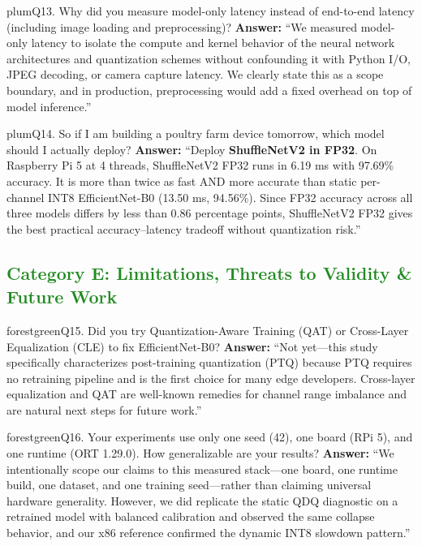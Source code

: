 \documentclass[10pt,a4paper]{article}
\begin{document}
\begin{qabox}{plum}{Q13. Why did you measure model-only latency instead of end-to-end latency (including image loading and preprocessing)?}
\textbf{Answer:}
``We measured model-only latency to isolate the compute and kernel behavior of the neural network architectures and quantization schemes without confounding it with Python I/O, JPEG decoding, or camera capture latency. We clearly state this as a scope boundary, and in production, preprocessing would add a fixed overhead on top of model inference.''
\end{qabox}

\begin{qabox}{plum}{Q14. So if I am building a poultry farm device tomorrow, which model should I actually deploy?}
\textbf{Answer:}
``Deploy \textbf{ShuffleNetV2 in FP32}. On Raspberry Pi 5 at 4 threads, ShuffleNetV2 FP32 runs in 6.19 ms with 97.69\% accuracy. It is more than twice as fast AND more accurate than static per-channel INT8 EfficientNet-B0 (13.50 ms, 94.56\%). Since FP32 accuracy across all three models differs by less than 0.86 percentage points, ShuffleNetV2 FP32 gives the best practical accuracy--latency tradeoff without quantization risk.''
\end{qabox}

\subsection*{\textcolor{forestgreen}{Category E: Limitations, Threats to Validity \& Future Work}}

\begin{qabox}{forestgreen}{Q15. Did you try Quantization-Aware Training (QAT) or Cross-Layer Equalization (CLE) to fix EfficientNet-B0?}
\textbf{Answer:}
``Not yet---this study specifically characterizes post-training quantization (PTQ) because PTQ requires no retraining pipeline and is the first choice for many edge developers. Cross-layer equalization and QAT are well-known remedies for channel range imbalance and are natural next steps for future work.''
\end{qabox}

\begin{qabox}{forestgreen}{Q16. Your experiments use only one seed (42), one board (RPi 5), and one runtime (ORT 1.29.0). How generalizable are your results?}
\textbf{Answer:}
``We intentionally scope our claims to this measured stack---one board, one runtime build, one dataset, and one training seed---rather than claiming universal hardware generality. However, we did replicate the static QDQ diagnostic on a retrained model with balanced calibration and observed the same collapse behavior, and our x86 reference confirmed the dynamic INT8 slowdown pattern.''
\end{qabox}
\end{document}
